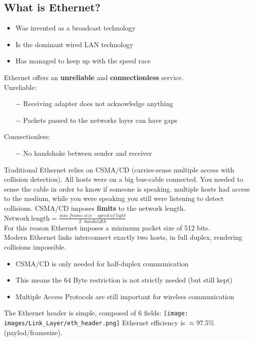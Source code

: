 \documentclass[a4paper, fontsize=8pt, landscape, DIV=1]{scrartcl}
\begin{document}
\begin{multicols*}{4}
   			\subsection{What is Ethernet?}
   			\begin{itemize}[noitemsep]
   				\item Was invented as a broadcast technology
   				\item Is the dominant wired LAN technology 
   				\item Has managed to keep up with the speed race
   			\end{itemize}
   			Ethernet offers an \textbf{unreliable} and \textbf{connectionless} service.\\
   			Unreliable:
   			\begin{itemize}[noitemsep]
   				\item[$-$] Receiving adapter does not acknowledge anything
   				\item[$-$] Packets passed to the networks layer can have gaps
   			\end{itemize}
   			Connectionless: 
   			\begin{itemize}[noitemsep]
   				\item[$-$] No handshake between sender and receiver
   			\end{itemize}
   			Traditional Ethernet relies on CSMA/CD (carries-sense multiple access with collision detection). All hosts were on a big bus-cable connected. You needed to sense the cable in order to know if someone is speaking. multiple hosts had access to the medium, while you were speaking you still were listening to detect collisions. CSMA/CD imposes \textbf{limits} to the network length.\\
   			$\mathrm{Network\ length}=\frac{min\ frame\ size\ \cdot\ speed\ of\ light}{2\cdot bandwidth}$\\
   			For this reason Ethernet imposes a minimum packet size of 512 bits.\\
   			Modern Ethernet links interconnect exactly two hosts, in full duplex, rendering collisions impossible. 
   			\begin{itemize}[noitemsep]
   				\item CSMA/CD is only needed for half-duplex communication
   				\item This means the 64 Byte restriction is not strictly needed (but still kept)
   				\item Multiple Access Protocols are still important for wireless communication
   			\end{itemize}
   			The Ethernet header is simple, composed of 6 fields: 
   			\texttt{[image: images/Link\_Layer/eth\_header.png]}
			Ethernet efficiency is $\approx97.5\%$ (paylod/framesize). 
			

\end{multicols*}
\end{document}
